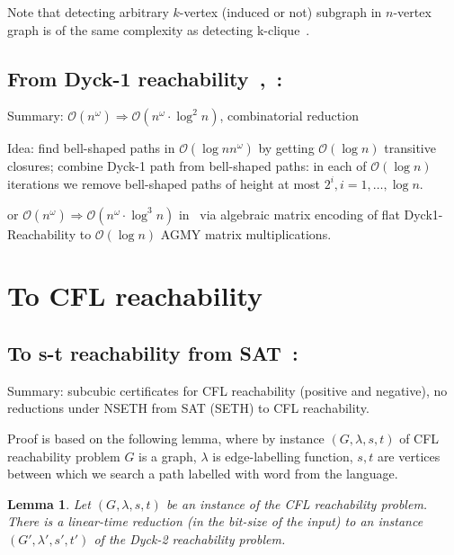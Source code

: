 \documentclass{amsart}
\newtheorem*{lemma}{Lemma}
\begin{document}
	Note that detecting arbitrary $k$-vertex (induced or not) subgraph in $n$-vertex graph is of the same complexity as detecting k-clique~\cite{nevsetvril1985complexity}.
	
	\subsection{From Dyck-1 reachability~\cite{bradford2017efficient},~\cite{10.1145/3434315}:\\}
	\label{bmm_to_dyck1}
	
	Summary: $\mathcal{O}(n^{\omega}) \Rightarrow \mathcal{O}(n^{\omega} \cdot \log^2 n)$, combinatorial reduction~\cite{10.1145/3434315}
	
	Idea: find bell-shaped paths in $\mathcal{O}(\log n n^{\omega})$ by getting $\mathcal{O}(\log n)$ transitive closures; combine Dyck-1 path from bell-shaped paths: in each of $\mathcal{O}(\log n)$ iterations we remove bell-shaped paths of height at most $2^i, i = 1, \ldots, \log n$.
	
	or $\mathcal{O}(n^{\omega}) \Rightarrow \mathcal{O}(n^{\omega} \cdot \log^3 n)$ in~\cite{bradford2017efficient} via algebraic matrix encoding of flat Dyck1-Reachability to $\mathcal{O}(\log n)$ AGMY matrix multiplications.
	
	\section{To CFL reachability}
	
	\subsection{To s-t reachability from SAT~\cite{chistikov2021subcubic}:\\}
	\label{dmchistikov}
	
	Summary: subcubic certificates for CFL reachability (positive and negative), no reductions under NSETH from SAT (SETH) to CFL reachability.
	
	Proof is based on the following lemma, where by instance $(G, \lambda, s, t)$ of CFL reachability problem $G$ is a graph, $\lambda$ is edge-labelling function, $s, t$ are vertices between which we search a path labelled with word from the language. 
	
	\begin{lemma}
		Let $(G,\lambda,s,t)$ be an instance of the CFL reachability problem. There is a linear-time reduction (in the bit-size of the input) to an instance $(G',\lambda',s',t')$ of the Dyck-2 reachability problem.
	\end{lemma}
	
\end{document}
